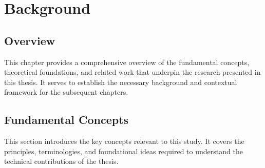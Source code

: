 \chapter{Background}
\label{chapter2}

\section{Overview}

\begin{paragraph}
This chapter provides a comprehensive overview of the fundamental concepts, theoretical foundations, and related work that underpin the research presented in this thesis. It serves to establish the necessary background and contextual framework for the subsequent chapters.
\end{paragraph}

\section{Fundamental Concepts}

\begin{paragraph}
This section introduces the key concepts relevant to this study. It covers the principles, terminologies, and foundational ideas required to understand the technical contributions of the thesis.
\end{paragraph}